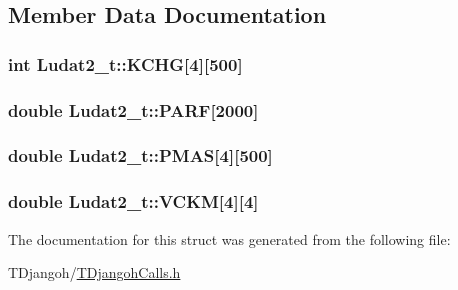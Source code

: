 \subsection{Member Data Documentation}
\hypertarget{struct_ludat2__t_ae7ac5c356f6954159345aa9043cde094}{
\subsubsection[{K\+C\+H\+G}]{\setlength{\rightskip}{0pt plus 5cm}int Ludat2\+\_\+t\+::\+K\+C\+H\+G\mbox{[}4\mbox{]}\mbox{[}500\mbox{]}}}\label{struct_ludat2__t_ae7ac5c356f6954159345aa9043cde094}
\hypertarget{struct_ludat2__t_a1691485f7138c4707132de64991719e5}{
\subsubsection[{P\+A\+R\+F}]{\setlength{\rightskip}{0pt plus 5cm}double Ludat2\+\_\+t\+::\+P\+A\+R\+F\mbox{[}2000\mbox{]}}}\label{struct_ludat2__t_a1691485f7138c4707132de64991719e5}
\hypertarget{struct_ludat2__t_a3ba40c50d21f9c3e2a9f27a1630e9199}{
\subsubsection[{P\+M\+A\+S}]{\setlength{\rightskip}{0pt plus 5cm}double Ludat2\+\_\+t\+::\+P\+M\+A\+S\mbox{[}4\mbox{]}\mbox{[}500\mbox{]}}}\label{struct_ludat2__t_a3ba40c50d21f9c3e2a9f27a1630e9199}
\hypertarget{struct_ludat2__t_a20d157be63ce36f91641642e81bb7334}{
\subsubsection[{V\+C\+K\+M}]{\setlength{\rightskip}{0pt plus 5cm}double Ludat2\+\_\+t\+::\+V\+C\+K\+M\mbox{[}4\mbox{]}\mbox{[}4\mbox{]}}}\label{struct_ludat2__t_a20d157be63ce36f91641642e81bb7334}


The documentation for this struct was generated from the following file\+:\begin{DoxyCompactItemize}
\item 
T\+Djangoh/\hyperlink{_t_djangoh_calls_8h}{T\+Djangoh\+Calls.\+h}\end{DoxyCompactItemize}
